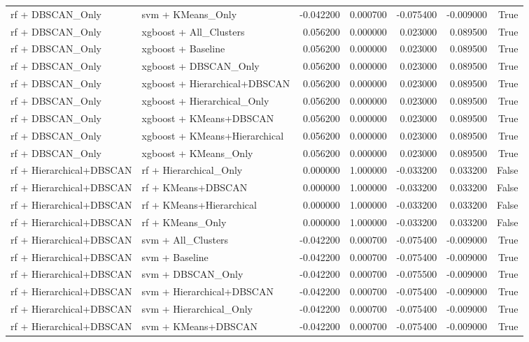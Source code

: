 \begin{tabular}{llrrrrr}
rf + DBSCAN_Only & svm + KMeans_Only & -0.042200 & 0.000700 & -0.075400 & -0.009000 & True \\
rf + DBSCAN_Only & xgboost + All_Clusters & 0.056200 & 0.000000 & 0.023000 & 0.089500 & True \\
rf + DBSCAN_Only & xgboost + Baseline & 0.056200 & 0.000000 & 0.023000 & 0.089500 & True \\
rf + DBSCAN_Only & xgboost + DBSCAN_Only & 0.056200 & 0.000000 & 0.023000 & 0.089500 & True \\
rf + DBSCAN_Only & xgboost + Hierarchical+DBSCAN & 0.056200 & 0.000000 & 0.023000 & 0.089500 & True \\
rf + DBSCAN_Only & xgboost + Hierarchical_Only & 0.056200 & 0.000000 & 0.023000 & 0.089500 & True \\
rf + DBSCAN_Only & xgboost + KMeans+DBSCAN & 0.056200 & 0.000000 & 0.023000 & 0.089500 & True \\
rf + DBSCAN_Only & xgboost + KMeans+Hierarchical & 0.056200 & 0.000000 & 0.023000 & 0.089500 & True \\
rf + DBSCAN_Only & xgboost + KMeans_Only & 0.056200 & 0.000000 & 0.023000 & 0.089500 & True \\
rf + Hierarchical+DBSCAN & rf + Hierarchical_Only & 0.000000 & 1.000000 & -0.033200 & 0.033200 & False \\
rf + Hierarchical+DBSCAN & rf + KMeans+DBSCAN & 0.000000 & 1.000000 & -0.033200 & 0.033200 & False \\
rf + Hierarchical+DBSCAN & rf + KMeans+Hierarchical & 0.000000 & 1.000000 & -0.033200 & 0.033200 & False \\
rf + Hierarchical+DBSCAN & rf + KMeans_Only & 0.000000 & 1.000000 & -0.033200 & 0.033200 & False \\
rf + Hierarchical+DBSCAN & svm + All_Clusters & -0.042200 & 0.000700 & -0.075400 & -0.009000 & True \\
rf + Hierarchical+DBSCAN & svm + Baseline & -0.042200 & 0.000700 & -0.075400 & -0.009000 & True \\
rf + Hierarchical+DBSCAN & svm + DBSCAN_Only & -0.042200 & 0.000700 & -0.075500 & -0.009000 & True \\
rf + Hierarchical+DBSCAN & svm + Hierarchical+DBSCAN & -0.042200 & 0.000700 & -0.075400 & -0.009000 & True \\
rf + Hierarchical+DBSCAN & svm + Hierarchical_Only & -0.042200 & 0.000700 & -0.075400 & -0.009000 & True \\
rf + Hierarchical+DBSCAN & svm + KMeans+DBSCAN & -0.042200 & 0.000700 & -0.075400 & -0.009000 & True \\

\end{tabular}
